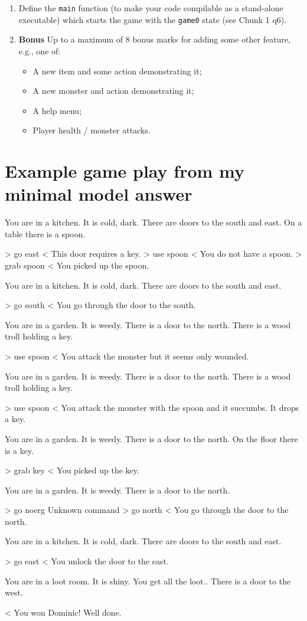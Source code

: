 \documentclass{article}
\newcommand{\topMarks}[1]{\marginnote{(#1 marks)}}
\begin{document}
\begin{enumerate}[leftmargin=1.4em]
\item \topMarks{1} Define the \texttt{main} function (to make your
code compilable as a stand-alone executable) which starts the game
with the \texttt{game0} state (see Chunk 1 q6).

\item \topMarks{8} \textbf{Bonus} Up to a maximum of 8 bonus marks for
adding some other feature, e.g., one of:
%
\begin{itemize}
\item A new item and some action demonstrating it;
\item A new monster and action demonstrating it;
\item A help menu;
\item Player health / monster attacks.
\end{itemize}
%
\end{enumerate}
%

\newpage

\appendix

\section{Example game play from my minimal model answer}

\begin{EVerbatim}
   You are in a kitchen. It is cold, dark.
   There are doors to the south and east.
   On a table there is a spoon.

> go east
< This door requires a key.
> use spoon
< You do not have a spoon.
> grab spoon
< You picked up the spoon.

   You are in a kitchen. It is cold, dark.
   There are doors to the south and east.

> go south
< You go through the door to the south.

   You are in a garden. It is weedy.
   There is a door to the north.
   There is a wood troll holding a key.

> use spoon
< You attack the monster but it seems only wounded.

   You are in a garden. It is weedy.
   There is a door to the north.
   There is a wood troll holding a key.

> use spoon
< You attack the monster with the spoon and it succumbs. It drops a key.

   You are in a garden. It is weedy.
   There is a door to the north.
   On the floor there is a key.

> grab key
< You picked up the key.

   You are in a garden. It is weedy.
   There is a door to the north.

> go noerg
Unknown command
> go north
< You go through the door to the north.

   You are in a kitchen. It is cold, dark.
   There are doors to the south and east.

> go east
< You unlock the door to the east.

   You are in a loot room. It is shiny. You get all the loot..
   There is a door to the west.

< You won Dominic! Well done.
\end{EVerbatim}
\end{document}
